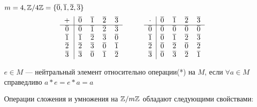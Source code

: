 \begin{normalsize}
\example\\
$m = 4, \mathbb{Z}/4\mathbb{Z} = \{\overline{0}, \overline{1}, \overline{2}, \overline{3}\}$\\
\[
\begin{tabular}{c|cccc}
    $+$ & $\overline{0}$ & $\overline{1}$ & $\overline{2}$ & $\overline{3}$\\
    \hline
    $\overline{0}$ & $\overline{0}$ & $\overline{1}$ & $\overline{2}$ & $\overline{3}$\\
    $\overline{1}$ & $\overline{1}$ & $\overline{2}$ & $\overline{3}$ & $\overline{0}$\\
    $\overline{2}$ & $\overline{2}$ & $\overline{3}$ & $\overline{0}$ & $\overline{1}$\\
    $\overline{3}$ & $\overline{3}$ & $\overline{0}$ & $\overline{1}$ & $\overline{2}$
\end{tabular}
\quad\quad\quad
\begin{tabular}{c|cccc}
    $\cdot$ & $\overline{0}$ & $\overline{1}$ & $\overline{2}$ & $\overline{3}$\\
    \hline
    $\overline{0}$ & $\overline{0}$ & $\overline{0}$ & $\overline{0}$ & $\overline{0}$\\
    $\overline{1}$ & $\overline{0}$ & $\overline{1}$ & $\overline{2}$ & $\overline{3}$\\
    $\overline{2}$ & $\overline{0}$ & $\overline{2}$ & $\overline{0}$ & $\overline{2}$\\
    $\overline{3}$ & $\overline{0}$ & $\overline{3}$ & $\overline{2}$ & $\overline{1}$
\end{tabular}
\]

\begin{defn}
    $e \in M$ --- нейтральный элемент относительно операции(*) на $M$, если $\forall a \in M$ справедливо $a * e = e * a = a$
\end{defn}

\begin{theorem-non}
    Операции сложения и умножения на $\mathbb{Z}/m\mathbb{Z}$ обладают следующими свойствами:
\end{theorem-non}


\end{normalsize}
